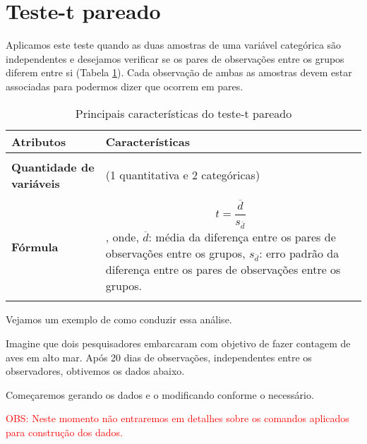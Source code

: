 \documentclass[14pt,titlepage, oneside, openany, a4paper]{book}
\begin{document}
\hypertarget{teste-t-pareado}{%
\section{Teste-t pareado}\label{teste-t-pareado}}

Aplicamos este teste quando as duas amostras de uma variável categórica são independentes e desejamos verificar se os pares de observações entre os grupos diferem entre si (Tabela \ref{tab:tab3t}). Cada observação de ambas as amostras devem estar associadas para podermos dizer que ocorrem em pares.

\begin{table}

\caption{\label{tab:tab3t}Principais características do teste-t pareado}
\centering
\begin{tabular}[c]{>{\raggedright\arraybackslash}p{10em}>{\raggedright\arraybackslash}p{30em}}
\toprule
Atributos & Características\\
\midrule
\textbf{\cellcolor{gray!6}{Tipo de variável}} & \cellcolor{gray!6}{Quantitativa e categórica}\\
\textbf{Quantidade de variáveis} & 3 (1 quantitativa e 2 categóricas)\\
\textbf{\cellcolor{gray!6}{Hipótese nula}} & \cellcolor{gray!6}{A diferença na média da variável quantitativa entre os pares de grupos é igual a 0.}\\
\textbf{Fórmula} & $$t=\frac{\overline{d}}{s_{\overline{d}}}$$, onde, $\overline{d}$: média da diferença entre os pares de observações entre os grupos, $s_{\overline{d}}$: erro padrão da diferença entre os pares de observações entre os grupos.\\
\textbf{\cellcolor{gray!6}{Observação}} & \cellcolor{gray!6}{Não há a necessidade de post-hoc nem expressa-la graficamente.}\\
\bottomrule
\end{tabular}
\end{table}

Vejamos um exemplo de como conduzir essa análise.

Imagine que dois pesquisadores embarcaram com objetivo de fazer contagem de aves em alto mar. Após 20 dias de observações, independentes entre os observadores, obtivemos os dados abaixo.

Começaremos gerando os dados e o modificando conforme o necessário.

\textcolor{red}{OBS: Neste momento não entraremos em detalhes sobre os comandos aplicados para construção dos dados.}
\end{document}
